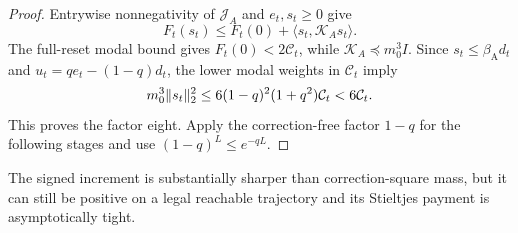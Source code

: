 \begin{proof}
Entrywise nonnegativity of $\mathcal J_A$ and $e_t,s_t\geq0$ give
\begin{equation*}
 F_t(s_t)\leq F_t(0)+\langle s_t,\mathcal K_As_t\rangle.
\end{equation*}
The full-reset modal bound gives $F_t(0)<2\mathcal C_t$, while
$\mathcal K_A\preceq m_0^3I$.  Since $s_t\leq\beta_{\mathrm A}d_t$ and
$u_t=qe_t-(1-q)d_t$, the lower modal weights in $\mathcal C_t$ imply
\begin{equation*}
 m_0^3\lVert s_t\rVert_2^2
 \leq6(1-q)^2(1+q^2)\mathcal C_t<6\mathcal C_t.
\end{equation*}
This proves the factor eight.  Apply the correction-free factor $1-q$ for the
following stages and use $(1-q)^L\leq e^{-qL}$.
\end{proof}

The signed increment is substantially sharper than correction-square mass,
but it can still be positive on a legal reachable trajectory and its
Stieltjes payment is asymptotically tight.

